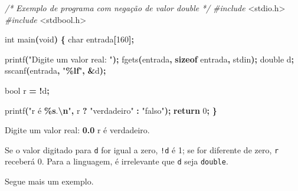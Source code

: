 \documentclass[
  11pt,
  a4paper,
]{scrbook}
\newenvironment{Shaded}{\begin{snugshade}}{\end{snugshade}}
\newcommand{\CommentTok}[1]{\textcolor[rgb]{0.56,0.35,0.01}{\textit{#1}}}
\newcommand{\ControlFlowTok}[1]{\textcolor[rgb]{0.13,0.29,0.53}{\textbf{#1}}}
\newcommand{\DataTypeTok}[1]{\textcolor[rgb]{0.13,0.29,0.53}{#1}}
\newcommand{\DecValTok}[1]{\textcolor[rgb]{0.00,0.00,0.81}{#1}}
\newcommand{\ImportTok}[1]{#1}
\newcommand{\KeywordTok}[1]{\textcolor[rgb]{0.13,0.29,0.53}{\textbf{#1}}}
\newcommand{\NormalTok}[1]{#1}
\newcommand{\OperatorTok}[1]{\textcolor[rgb]{0.81,0.36,0.00}{\textbf{#1}}}
\newcommand{\PreprocessorTok}[1]{\textcolor[rgb]{0.56,0.35,0.01}{\textit{#1}}}
\newcommand{\SpecialCharTok}[1]{\textcolor[rgb]{0.81,0.36,0.00}{\textbf{#1}}}
\newcommand{\StringTok}[1]{\textcolor[rgb]{0.31,0.60,0.02}{#1}}
\begin{document}
\begin{Shaded}
\begin{Highlighting}[]
\CommentTok{/*}
\CommentTok{Exemplo de programa com negação de valor double}
\CommentTok{*/}
\PreprocessorTok{\#include }\ImportTok{\textless{}stdio.h\textgreater{}}
\PreprocessorTok{\#include }\ImportTok{\textless{}stdbool.h\textgreater{}}

\DataTypeTok{int}\NormalTok{ main}\OperatorTok{(}\DataTypeTok{void}\OperatorTok{)} \OperatorTok{\{}
    \DataTypeTok{char}\NormalTok{ entrada}\OperatorTok{[}\DecValTok{160}\OperatorTok{];}

\NormalTok{    printf}\OperatorTok{(}\StringTok{"Digite um valor real: "}\OperatorTok{);}
\NormalTok{    fgets}\OperatorTok{(}\NormalTok{entrada}\OperatorTok{,} \KeywordTok{sizeof}\NormalTok{ entrada}\OperatorTok{,}\NormalTok{ stdin}\OperatorTok{);}
    \DataTypeTok{double}\NormalTok{ d}\OperatorTok{;}
\NormalTok{    sscanf}\OperatorTok{(}\NormalTok{entrada}\OperatorTok{,} \StringTok{"}\SpecialCharTok{\%lf}\StringTok{"}\OperatorTok{,} \OperatorTok{\&}\NormalTok{d}\OperatorTok{);}

    \DataTypeTok{bool}\NormalTok{ r }\OperatorTok{=} \OperatorTok{!}\NormalTok{d}\OperatorTok{;}

\NormalTok{    printf}\OperatorTok{(}\StringTok{"r é }\SpecialCharTok{\%s}\StringTok{.}\SpecialCharTok{\textbackslash{}n}\StringTok{"}\OperatorTok{,}\NormalTok{ r }\OperatorTok{?} \StringTok{"verdadeiro"} \OperatorTok{:} \StringTok{"falso"}\OperatorTok{);}
    \ControlFlowTok{return} \DecValTok{0}\OperatorTok{;}
\OperatorTok{\}}
\end{Highlighting}
\end{Shaded}

\begin{Shaded}
\begin{Highlighting}[]
\NormalTok{Digite um valor real: }\KeywordTok{ 0.0 }
\NormalTok{r é verdadeiro.}
\end{Highlighting}
\end{Shaded}

Se o valor digitado para \texttt{d} for igual a zero, \texttt{!d} é 1;
se for diferente de zero, \texttt{r} receberá 0. Para a linguagem, é
irrelevante que \texttt{d} seja \texttt{double}.

Segue mais um exemplo.
\end{document}
